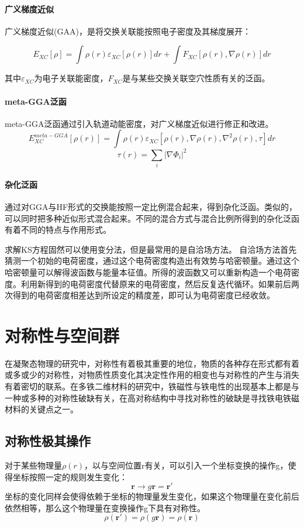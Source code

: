 \paragraph{广义梯度近似} 广义梯度近似(GAA)，是将交换关联能按照电子密度及其梯度展开：

$$E_{XC}[\rho]=\int \rho(r) \varepsilon _{XC} [\rho (r)]dr+\int F_{XC}[\rho (r) , \nabla   \rho(r)]dr $$

其中$\varepsilon_{XC}$为电子关联能密度，$F_{XC}$是与某些交换关联空穴性质有关的泛函。
\paragraph{meta-GGA泛函} meta-GGA泛函通过引入轨道动能密度，对广义梯度近似进行修正和改进。
$$E_{XC}^{meta-GGA}[\rho(r)]=\int \rho(r)\varepsilon_{XC}[\rho(r),\nabla \rho(r),\nabla^{2} \rho(r),\tau]dr$$
$$\tau(r)=\sum_{i} |\nabla\Phi_{i} | ^{2}$$
\paragraph{杂化泛函} 通过对GGA与HF形式的交换能按照一定比例混合起来，得到杂化泛函。类似的，可以同时把多种近似形式混合起来。不同的混合方式与混合比例所得到的杂化泛函有着不同的特点与作用形式。

求解KS方程固然可以使用变分法，但是最常用的是自洽场方法。\cite{黄时中1998双电子体系的简单自洽场计算} 自洽场方法首先猜测一个初始的电荷密度，通过这个电荷密度构造出有效势与哈密顿量。通过这个哈密顿量可以解得波函数与能量本征值。所得的波函数又可以重新构造一个电荷密度。利用新得到的电荷密度代替原来的电荷密度，然后反复迭代循环。如果前后两次得到的电荷密度相差达到所设定的精度差，即可认为电荷密度已经收敛。

\section{对称性与空间群}

在凝聚态物理的研究中，对称性有着极其重要的地位，物质的各种存在形式都有着或多或少的对称性，对物质性质变化其决定性作用的相变也与对称性的产生与消失有着密切的联系。在多铁二维材料的研究中，铁磁性与铁电性的出现基本上都是与一种或多种的对称性破缺有关，在高对称结构中寻找对称性的破缺是寻找铁电铁磁材料的关键点之一。

\subsection{对称性极其操作}

对于某些物理量$\rho(r)$，以与空间位置r有关，可以引入一个坐标变换的操作g，使得坐标按照一定的规则发生变化：
\begin{equation}
    \bm{r} \rightarrow  g\bm{r} = \bm{r}'
\end{equation}
坐标的变化同样会使得依赖于坐标的物理量发生变化，如果这个物理量在变化前后依然相等，那么这个物理量在变换操作g下具有对称性。
\begin{equation}
    \rho (\bm{r}') = \rho (g \bm{r}) = \rho (\bm{r})
\end{equation}

